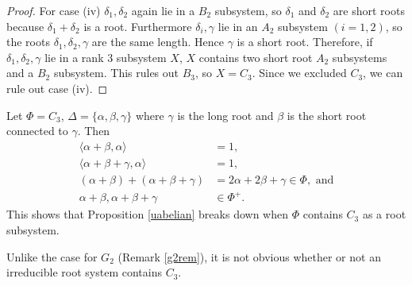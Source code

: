 \begin{proof}
For case (iv) $\delta_1, \delta_2$ again lie in a $B_2$ subsystem, so $\delta_1$ and $\delta_2$ are short roots because $\delta_1+\delta_2$ is a root. Furthermore $\delta_i, \gamma$ lie in an $A_2$ subsystem $(i = 1, 2)$, so the roots $\delta_1, \delta_2, \gamma$ are the same length. Hence $\gamma$ is a short root. Therefore, if $\delta_1, \delta_2, \gamma$  lie in a rank 3 subsystem $X$, $X$ contains two short root $A_2$ subsystems and a $B_2$ subsystem. This rules out $B_3$, so $X=C_3$. Since we excluded $C_3$, we can rule out case (iv).
\end{proof}

\begin{remark}\label{c3counter}
Let $\Phi = C_3$, $\Delta = \{\alpha, \beta, \gamma\}$ where $\gamma$ is the long root and $\beta$ is the short root connected to $\gamma$. Then
\begin{align*}
	\langle \alpha + \beta, \alpha \rangle &= 1, \\
	\langle \alpha + \beta + \gamma, \alpha \rangle &= 1, \\
	(\alpha + \beta) + (\alpha + \beta + \gamma) &= 2\alpha + 2\beta + \gamma \in \Phi, \textrm{ and} \\
	\alpha + \beta, \alpha + \beta + \gamma &\in \Phi^+.
\end{align*}
This shows that Proposition \ref{uabelian} breaks down when $\Phi$ contains $C_3$ as a root subsystem. 
\end{remark}
\begin{remark}\label{c3rem}
Unlike the case for $G_2$ (Remark \ref{g2rem}), it is not obvious whether or not an irreducible root system contains $C_3$.
\end{remark}

